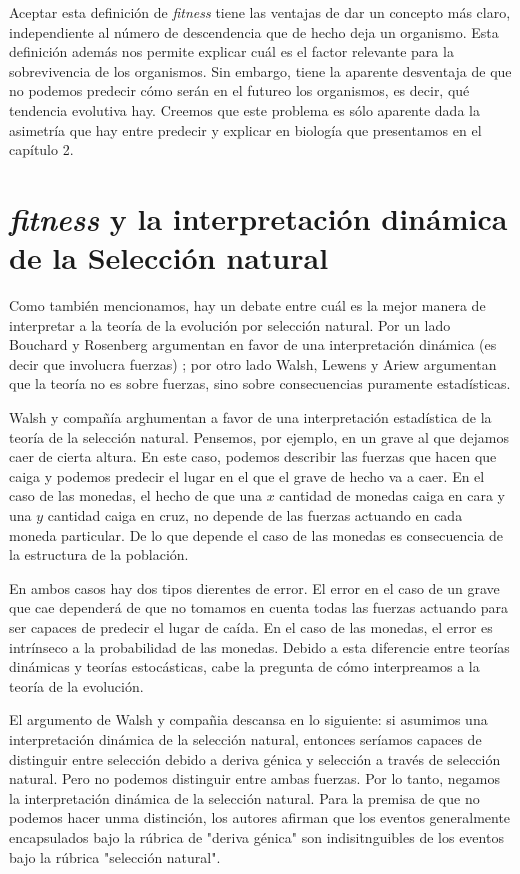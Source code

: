 Aceptar esta definición de \emph{fitness} tiene las ventajas de dar un concepto más claro, independiente al número de descendencia que de hecho deja un organismo. Esta definición además nos permite explicar cuál es el factor relevante para la sobrevivencia de los organismos. Sin embargo, tiene la aparente desventaja de que no podemos predecir cómo serán en el futureo los organismos, es decir, qué tendencia evolutiva hay. Creemos que este problema es sólo aparente dada la asimetría que hay entre predecir y explicar en biología que presentamos en el capítulo 2.

\section{\emph{fitness} y la interpretación dinámica de la Selección natural}

Como también mencionamos, hay un debate entre cuál es la mejor manera de interpretar a la teoría de la evolución por selección natural. Por un lado Bouchard y Rosenberg argumentan en favor de una interpretación dinámica (es decir que involucra fuerzas) \citeyear{Bouchard2004}; por otro lado Walsh, Lewens y Ariew \citeyear{Walsh2002} argumentan que la teoría no es sobre fuerzas, sino sobre consecuencias puramente estadísticas.

Walsh y compañía arghumentan a favor de una interpretación estadística de la teoría de la selección natural. Pensemos, por ejemplo, en un grave al que dejamos caer de cierta altura. En este caso, podemos describir las fuerzas que hacen que caiga y podemos predecir el lugar en el que el grave de hecho va a caer. En el caso de las monedas, el hecho de que una $x$ cantidad de monedas caiga en cara y una $y$ cantidad caiga en cruz, no depende de las fuerzas actuando en cada moneda particular. De lo que depende el caso de las monedas es consecuencia de la estructura de la población.

En ambos casos hay dos tipos dierentes de error. El error en el caso de un grave que cae dependerá de que no tomamos en cuenta todas las fuerzas actuando para ser capaces de predecir el lugar de caída. En el caso de las monedas, el error es intrínseco a la probabilidad de las monedas. Debido a esta diferencie entre teorías dinámicas y teorías estocásticas, cabe la pregunta de cómo interpreamos a la teoría de la evolución.

El argumento de Walsh y compañia descansa en lo siguiente: si asumimos una interpretación dinámica de la selección natural, entonces seríamos capaces de distinguir entre selección debido a deriva génica y selección a través de selección natural. Pero no podemos distinguir entre ambas fuerzas. Por lo tanto, negamos la interpretación dinámica de la selección natural. Para la premisa de que no podemos hacer unma distinción, los autores afirman que los eventos generalmente encapsulados bajo la rúbrica de "deriva génica" son indisitnguibles de los eventos bajo la rúbrica "selección natural".

